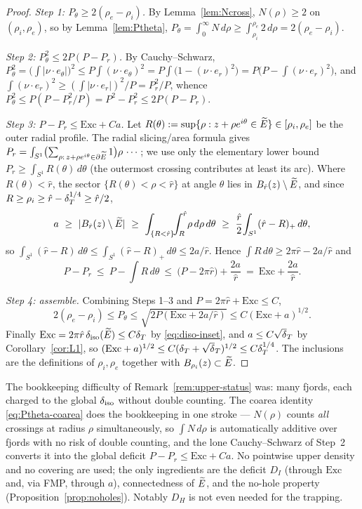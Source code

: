 \begin{proof}
\emph{Step 1: $P_\theta\ge2(\rho_e-\rho_i)$.} By
Lemma~\ref{lem:Ncross}, $N(\rho)\ge2$ on $(\rho_i,\rho_e)$, so by
Lemma~\ref{lem:Ptheta},
$P_\theta=\int_0^\infty N\,d\rho\ge\int_{\rho_i}^{\rho_e}2\,d\rho
=2(\rho_e-\rho_i)$.

\emph{Step 2: $P_\theta^2\le 2P(P-P_r)$.} By Cauchy--Schwarz,
$P_\theta^2=\bigl(\int|\nu\cdot e_\theta|\bigr)^2\le P\int(\nu\cdot
e_\theta)^2=P\int\bigl(1-(\nu\cdot e_r)^2\bigr)=P\bigl(P-\int(\nu\cdot
e_r)^2\bigr)$, and $\int(\nu\cdot e_r)^2\ge(\int|\nu\cdot e_r|)^2/P=P_r^2/P$,
whence $P_\theta^2\le P(P-P_r^2/P)=P^2-P_r^2\le 2P(P-P_r)$.

\emph{Step 3: $P-P_r\le\mathrm{Exc}+Ca$.} Let $R(\theta):=\sup\{\rho:
z+\rho e^{i\theta}\in\widetilde E\}\in[\rho_i,\rho_e]$ be the outer radial profile.
The radial slicing/area formula gives
$P_r=\int_{S^1}\bigl(\sum_{\rho:\,z+\rho e^{i\theta}\in\partial\widetilde E}1\bigr)
\rho\,\cdots$; we use only the elementary lower bound $P_r\ge\int_{S^1}
R(\theta)\,d\theta$ (the outermost crossing contributes at least its arc).
Where $R(\theta)<\hat r$, the sector $\{R(\theta)<\rho<\hat r\}$ at angle
$\theta$ lies in $B_{\hat r}(z)\setminus\widetilde E$, and since $R\ge\rho_i\ge
\hat r-\delta_T^{1/4}\ge\hat r/2$,
\[
   a\ \ge\ |B_{\hat r}(z)\setminus\Etil|
   \ \ge\ \int_{\{R<\hat r\}}\!\!\int_R^{\hat r}\!\rho\,d\rho\,d\theta
   \ \ge\ \frac{\hat r}{2}\!\int_{S^1}(\hat r-R)_+\,d\theta,
\]
so $\int_{S^1}(\hat r-R)\,d\theta\le\int_{S^1}(\hat r-R)_+\,d\theta\le
2a/\hat r$. Hence $\int R\,d\theta\ge2\pi\hat r-2a/\hat r$ and
\[
   P-P_r\ \le\ P-\!\int R\,d\theta\ \le\ \bigl(P-2\pi\hat r\bigr)+\frac{2a}{\hat r}
   \ =\ \mathrm{Exc}+\frac{2a}{\hat r}.
\]

\emph{Step 4: assemble.} Combining Steps 1--3 and $P=2\pi\hat r+\mathrm{Exc}
\le C$,
\[
   2(\rho_e-\rho_i)\le P_\theta\le\sqrt{2P(\mathrm{Exc}+2a/\hat r)}
   \le C(\mathrm{Exc}+a)^{1/2}.
\]
Finally $\mathrm{Exc}=2\pi\hat r\,\delta_{\mathrm{iso}}(\widetilde E)\le C\delta_T$ by
\eqref{eq:diso-inset}, and $a\le C\sqrt\dT$ by Corollary~\ref{cor:L1}, so
$(\mathrm{Exc}+a)^{1/2}\le C(\dT+\sqrt\dT)^{1/2}\le C\dT^{1/4}$. The
inclusions are the definitions of $\rho_i,\rho_e$ together with
$B_{\rho_i}(z)\subset\widetilde E$.
\end{proof}

\begin{remark}\label{rem:covering-gone}
The bookkeeping difficulty of Remark~\ref{rem:upper-status} was: many
fjords, each charged to the global $\delta_{\mathrm{iso}}$ without double counting. The
coarea identity \eqref{eq:Ptheta-coarea} does the bookkeeping in one stroke
--- $N(\rho)$ counts \emph{all} crossings at radius $\rho$ simultaneously,
so $\int N\,d\rho$ is automatically additive over fjords with no risk of
double counting, and the lone Cauchy--Schwarz of Step~2 converts it into the
global deficit $P-P_r\le\mathrm{Exc}+Ca$. No pointwise upper density and no
covering are used; the only ingredients are the deficit $D_I$ (through
$\mathrm{Exc}$ and, via FMP, through $a$), connectedness of $\widetilde E$, and the
no-hole property (Proposition~\ref{prop:noholes}). Notably $D_H$ is not even
needed for the trapping.
\end{remark}

